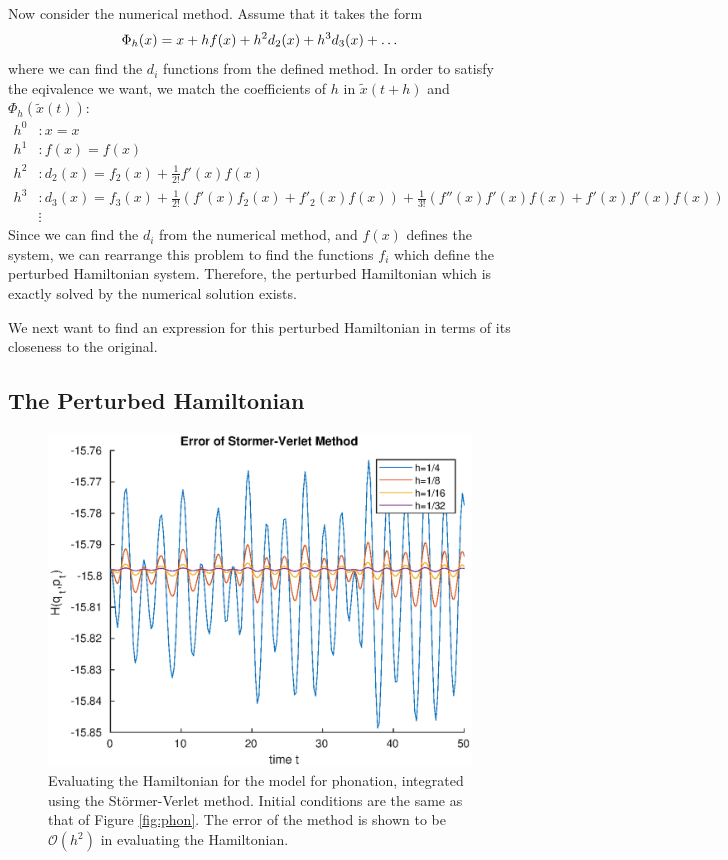 Now consider the numerical method. Assume that it takes the form
\begin{equation*}
	\Phi_h(x) = x + h f(x) + h^2 d_2(x) + h^3 d_3(x) + \mathellipsis
\end{equation*}
where we can find the $d_i$ functions from the defined method. In order to satisfy the eqivalence we want, we match the coefficients of $h$ in $\tilde{x}(t+h)$ and $\Phi_h(\tilde{x}(t))$:
\begin{align*}
	h^0 &: x=x \\
	h^1 &: f(x) = f(x) \\
	h^2 &: d_2(x) = f_2(x) + \frac{1}{2!}f'(x)f(x) \\
	h^3 &: d_3(x) = f_3(x) + \frac{1}{2!}(f'(x)f_2(x) + f'_2(x)f(x)) + \frac{1}{3!}(f''(x)f'(x)f(x) + f'(x)f'(x)f(x)) \\
	& \vdots
\end{align*}
Since we can find the $d_i$ from the numerical method, and $f(x)$ defines the system,
we can rearrange this problem to find the functions $f_i$ which define the perturbed Hamiltonian system.
Therefore, the perturbed Hamiltonian which is exactly solved by the numerical solution exists. 

We next want to find an expression for this perturbed Hamiltonian in terms of its closeness to the original.

\subsection{The Perturbed Hamiltonian}

\begin{figure}
	\centering
	\includegraphics[width = 0.5\linewidth]{figures/phonationerr.eps}
	\caption{
		Evaluating the Hamiltonian for the model for phonation, integrated using the St\"ormer-Verlet method.
		Initial conditions are the same as that of Figure \ref{fig:phon}.
		The error of the method is shown to be $\mathcal{O}(h^2)$ in evaluating the Hamiltonian.
	}
	\label{fig:phonhamil}
\end{figure}

